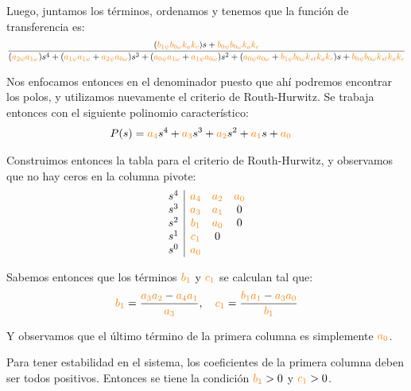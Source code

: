 Luego, juntamos los términos, ordenamos y tenemos que la función de transferencia
es:
\begin{equation}
  \dfrac{(\nara{b_{1\psi} b_{0\omega} k_a k_c})s + \nara{b_{0\psi} b_{0\omega} k_a k_c}}
  {(\nara{a_{2\psi} a_{1\omega}}) s^4 +
  (\nara{a_{1\psi} a_{1\omega}} + \nara{a_{2\psi} a_{0\omega}}) s^3 + 
  (\nara{a_{0\psi} a_{1\omega}} + \nara{a_{1\psi} a_{0\omega}}) s^2 + 
  (\nara{a_{0\psi} a_{0\omega}} + \nara{b_{1\psi} b_{0\omega}k_{st} k_a k_c})s+ 
  \nara{b_{0\psi} b_{0\omega} k_{st} k_a k_c}}
\end{equation}

Nos enfocamos entonces en el denominador puesto que ahí podremos encontrar los
polos, y utilizamos nuevamente el criterio de Routh-Hurwitz. Se trabaja entonces
con el siguiente polinomio característico:
\begin{align}\label{eq:polinomio-prob-e}
    P(s) = \nara{a_4} s^4 + \nara{a_3} s^3 + \nara{a_2} s^2 + \nara{a_1} s + \nara{a_0} &
\end{align}

Construimos entonces la tabla para el criterio de Routh-Hurwitz, y observamos
que no hay ceros en la columna pivote:
\begin{equation}
  \begin{array}{c|ccc}
    s^4 & \nara{a_4} & \nara{a_2} & \nara{a_0} \\
    s^3 & \nara{a_3} & \nara{a_1} & 0\\
    s^2 & \nara{b_1} & \nara{a_0} & 0\\
    s^1 & \nara{c_1} & 0 \\
    s^0 & \nara{a_0} & 
  \end{array}
\end{equation}

Sabemos entonces que los términos $\nara{b_1}$ y $\nara{c_1}$ se calculan tal
que:
\begin{equation}
  \nara{b_1} = \frac{\nara{a_3 a_2} - \nara{a_4 a_1}}{\nara{a_3}},
  \quad \nara{c_1} = \frac{\nara{b_1 a_1} - \nara{a_3 a_0}}{\nara{b_1}}
\end{equation}

Y observamos que el último término de la primera columna es simplemente $\nara{a_0}$.

Para tener estabilidad en el sistema, los coeficientes de la primera columna
deben ser todos positivos. Entonces se tiene la condición $\nara{b_{1}} > 0$
y $\nara{c_{1}} > 0$.

